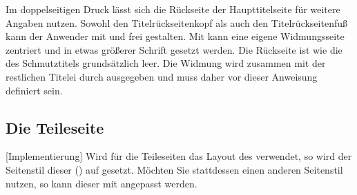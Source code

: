 \begin{Declaration}{}
\begin{Declaration}{}
\begin{Declaration}{}
\begin{Declaration}{}
\begin{Declaration}{}
\begin{Declaration}{}
\begin{Declaration}{}
\begin{Declaration}{}
\begin{Declaration}{}
%
Im doppelseitigen Druck lässt sich die Rückseite der Haupttitelseite für 
weitere Angaben nutzen. Sowohl den Titelrückseitenkopf als auch den
Titelrückseitenfuß kann der Anwender mit  und 
 frei gestalten.
%
Mit  kann eine eigene Widmungsseite zentriert und in etwas 
größerer Schrift gesetzt werden. Die Rückseite ist wie die des Schmutztitels 
grundsätzlich leer. Die Widmung wird zusammen mit der restlichen Titelei durch 
 ausgegeben und muss daher vor dieser Anweisung definiert sein.
\end{Declaration}
\end{Declaration}
\end{Declaration}
\end{Declaration}
\end{Declaration}
\end{Declaration}
\end{Declaration}
\end{Declaration}
\end{Declaration}


\subsection{Die Teileseite}
\label{sec:part}
%
[Implementierung]
Wird für die Teileseiten das Layout des \CDs verwendet, so wird der Seitenstil 
dieser () auf  gesetzt. 
Möchten Sie stattdessen einen anderen Seitenstil nutzen, so kann dieser mit 
angepasst werden.

